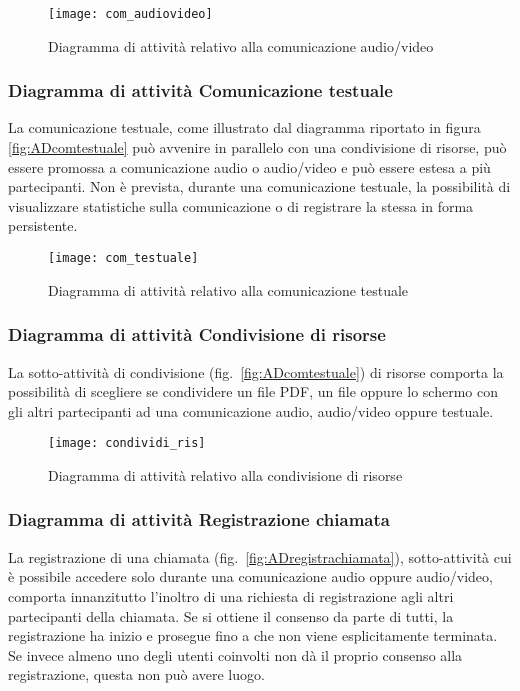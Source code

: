 \begin{figure}[H]
\centering
\texttt{[image: com\_audiovideo]}
\caption{Diagramma di attività relativo alla comunicazione audio/video}\label{fig:ADcomaudiovideo}
\end{figure}

\subsubsection{Diagramma di attività Comunicazione testuale}
La comunicazione testuale, come illustrato dal diagramma riportato in figura \vref{fig:ADcomtestuale} può avvenire in parallelo con una condivisione di risorse, può essere promossa a comunicazione audio o audio/video e può essere estesa a più partecipanti. Non è prevista, durante una comunicazione testuale, la possibilità di visualizzare statistiche sulla comunicazione o di registrare la stessa in forma persistente.

\begin{figure}[H]
\centering
\texttt{[image: com\_testuale]}
\caption{Diagramma di attività relativo alla comunicazione testuale}\label{fig:ADcomtestuale}
\end{figure}

\subsubsection{Diagramma di attività Condivisione di risorse}
La sotto-attività di condivisione (fig.~\vref{fig:ADcomtestuale}) di risorse comporta la possibilità di scegliere se condividere un file PDF, un file oppure lo schermo con gli altri partecipanti ad una comunicazione audio, audio/video oppure testuale.

\begin{figure}[H]
\centering
\texttt{[image: condividi\_ris]}
\caption{Diagramma di attività relativo alla condivisione di risorse}\label{fig:ADcondrisorse}
\end{figure}

\subsubsection{Diagramma di attività Registrazione chiamata}
La registrazione di una chiamata (fig.~\vref{fig:ADregistrachiamata}), sotto-attività cui è possibile accedere solo durante una comunicazione audio oppure audio/video, comporta innanzitutto l'inoltro di una richiesta di registrazione agli altri partecipanti della chiamata. Se si ottiene il consenso da parte di tutti, la registrazione ha inizio e prosegue fino a che non viene esplicitamente terminata. Se invece almeno uno degli utenti coinvolti non dà il proprio consenso alla registrazione, questa non può avere luogo.

